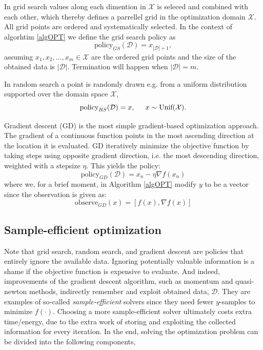 \begin{testexample}
    In grid search values along each dimention in $\mathcal{X}$ is seleced and combined with each
    other, which thereby defines a parrellel grid in the optimization domain $\mathcal{X}$. All
    grid points are ordered and systematically selected. In the context of algorhtim \ref{algOPT} we define
    the grid search policy as 
    $$\text{policy}_{GS}(\mathcal{D}) = x_{|\mathcal{D}|+1},$$
    assuming $x_1,x_2, \dots, x_{m} \in \mathcal{X}$ are the ordered grid points and the size of the obtained 
    data is $|\mathcal{D}|$. Termination will happen when $|\mathcal{D}| = m$.
\end{testexample}
\begin{testexample}
    In random search a point is randomly drawn e.g. from a uniform distribution supported over the domain
    space $\mathcal{X}$, 
    $$\text{policy}_{RS}(\mathcal{D}) = x, \hspace{0.5cm} x \sim \text{Unif}(\mathcal{X}).$$
\end{testexample}
\begin{testexample}
    Gradient descent (GD) is the most simple gradient-based optimization approach. The gradient of a
    continuous function points in the most ascending direction at the location it is evaluated. GD
    iteratively minimize the objective function by taking steps using opposite gradient direction,
    i.e. the most descending direction, weighted with a stepsize $\eta$. This yields the policy:
    $$\text{policy}_{GD}(\mathcal{D}) = x_n - \eta \nabla f(x_n)$$
    where we, for a brief moment, in Algorithm \eqref{algOPT} modify $y$ to be a vector since the observation 
    is given as:
    $$\text{observe}_{GD}(x) = [f(x), \nabla f(x)]$$
\end{testexample}

\subsection{Sample-efficient optimization}
Note that grid search, random search, and gradient descent are policies that entirely ignore the
available data. Ignoring potentially valuable information is a shame if the objective function is
expensive to evaluate. And indeed, improvements of the gradient descent algorithm, such as momentum
and quasi-newton methods, indirectly remember and exploit obtained data, $\mathcal{D}$. They are
examples of so-called \textit{sample-efficient} solvers since they need fewer $y$-samples to
minimize $f(\cdot)$. Choosing a more sample-efficient solver ultimately costs extra time/energy, due
to the extra work of storing and exploiting the collected information for every iteration. In the
end, solving the optimization problem can be divided into the following components, 

